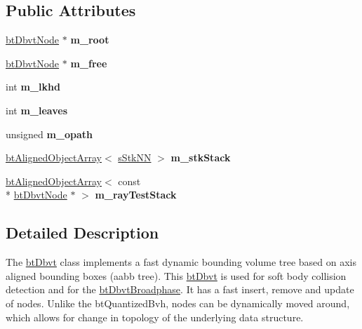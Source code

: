 \subsection*{Public Attributes}
\begin{DoxyCompactItemize}
\item 
\hypertarget{structbt_dbvt_ac79cacfc8471aa681ee8756ca9d5683a}{\hyperlink{structbt_dbvt_node}{bt\+Dbvt\+Node} $\ast$ {\bfseries m\+\_\+root}}\label{structbt_dbvt_ac79cacfc8471aa681ee8756ca9d5683a}

\item 
\hypertarget{structbt_dbvt_a80f8054d42c4053179481609557208f0}{\hyperlink{structbt_dbvt_node}{bt\+Dbvt\+Node} $\ast$ {\bfseries m\+\_\+free}}\label{structbt_dbvt_a80f8054d42c4053179481609557208f0}

\item 
\hypertarget{structbt_dbvt_acd77bda8e22d25d2d251178f6155cde0}{int {\bfseries m\+\_\+lkhd}}\label{structbt_dbvt_acd77bda8e22d25d2d251178f6155cde0}

\item 
\hypertarget{structbt_dbvt_a8fe957e11b755e1bd5f8df46000390b0}{int {\bfseries m\+\_\+leaves}}\label{structbt_dbvt_a8fe957e11b755e1bd5f8df46000390b0}

\item 
\hypertarget{structbt_dbvt_a3887b5ca4953188b53f4261dac5c704b}{unsigned {\bfseries m\+\_\+opath}}\label{structbt_dbvt_a3887b5ca4953188b53f4261dac5c704b}

\item 
\hypertarget{structbt_dbvt_a716f85528e16cbcb3077cf989ddc69be}{\hyperlink{classbt_aligned_object_array}{bt\+Aligned\+Object\+Array}$<$ \hyperlink{structbt_dbvt_1_1s_stk_n_n}{s\+Stk\+N\+N} $>$ {\bfseries m\+\_\+stk\+Stack}}\label{structbt_dbvt_a716f85528e16cbcb3077cf989ddc69be}

\item 
\hypertarget{structbt_dbvt_ac6992e9e7335dc1b1d0bfdb8ba7daf61}{\hyperlink{classbt_aligned_object_array}{bt\+Aligned\+Object\+Array}$<$ const \\*
\hyperlink{structbt_dbvt_node}{bt\+Dbvt\+Node} $\ast$ $>$ {\bfseries m\+\_\+ray\+Test\+Stack}}\label{structbt_dbvt_ac6992e9e7335dc1b1d0bfdb8ba7daf61}

\end{DoxyCompactItemize}


\subsection{Detailed Description}
The \hyperlink{structbt_dbvt}{bt\+Dbvt} class implements a fast dynamic bounding volume tree based on axis aligned bounding boxes (aabb tree). This \hyperlink{structbt_dbvt}{bt\+Dbvt} is used for soft body collision detection and for the \hyperlink{structbt_dbvt_broadphase}{bt\+Dbvt\+Broadphase}. It has a fast insert, remove and update of nodes. Unlike the bt\+Quantized\+Bvh, nodes can be dynamically moved around, which allows for change in topology of the underlying data structure. 


